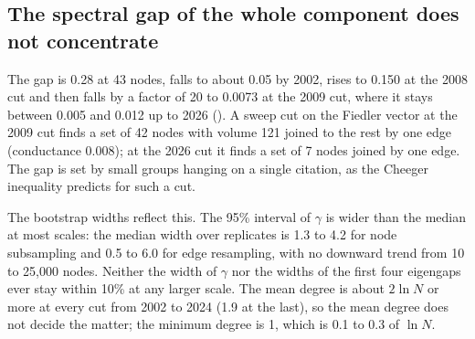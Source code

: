 \documentclass[11pt]{article}
\begin{document}
\subsection{The spectral gap of the whole component does not concentrate}
The gap is 0.28 at 43 nodes, falls to about 0.05 by 2002, rises to 0.150 at the 2008 cut and then
falls by a factor of 20 to 0.0073 at the 2009 cut, where it stays between 0.005 and 0.012 up to
2026 (). A sweep cut on the Fiedler vector at the 2009 cut finds a set of 42 nodes
with volume 121 joined to the rest by one edge (conductance 0.008); at the 2026 cut it finds a set
of 7 nodes joined by one edge. The gap is set by small groups hanging on a single citation, as the
Cheeger inequality predicts for such a cut.

The bootstrap widths reflect this. The 95\% interval of $\gamma$ is wider than the median at most scales:
the median width over replicates is 1.3 to 4.2 for node subsampling and 0.5 to 6.0 for edge resampling,
with no downward trend from 10 to 25,000 nodes. Neither the width of $\gamma$ nor the widths of the
first four eigengaps ever stay within 10\% at any larger scale. The mean degree is about $2\ln N$ or more at
every cut from 2002 to 2024 (1.9 at the last), so the mean degree does not decide the matter; the minimum degree is 1, which is 0.1 to 0.3 of
$\ln N$.
\end{document}
